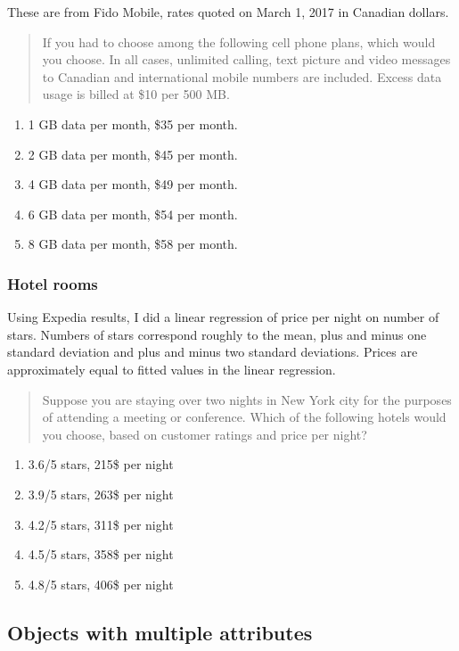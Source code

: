 \documentclass[11pt,letter]{amsart}
\begin{document}
These are from Fido Mobile, rates quoted on March 1, 2017 in Canadian dollars.

\begin{quotation}
	If you had to choose among the following cell phone plans, which would you choose. In all cases, unlimited calling, text picture and video messages to Canadian and international mobile numbers are included. Excess data usage is billed at \$10 per 500 MB.
\end{quotation}

\begin{enumerate}
	\item 1 GB data per month, \$35 per month.
	\item 2 GB data per month, \$45 per month.
	\item 4 GB data per month, \$49 per month.
	\item 6 GB data per month, \$54 per month.
	\item 8 GB data per month, \$58 per month.
\end{enumerate}

\subsubsection{Hotel rooms}
Using Expedia results, I did a linear regression of price per night on number of stars.
Numbers of stars correspond roughly to the mean, plus and minus one standard deviation and plus and minus two standard deviations.
Prices are approximately equal to fitted values in the linear regression.

\begin{quotation}
Suppose you are staying over two nights in New York city for the purposes of attending a meeting or conference. Which of the following hotels would you choose, based on customer ratings and price per night?	
\end{quotation}

\begin{enumerate}
	\item 3.6/5 stars, 215\$ per night
	\item 3.9/5 stars, 263\$ per night
	\item 4.2/5 stars, 311\$ per night
	\item 4.5/5 stars, 358\$ per night
	\item 4.8/5 stars, 406\$ per night	
\end{enumerate}

\subsection{Objects with multiple attributes}
\end{document}
